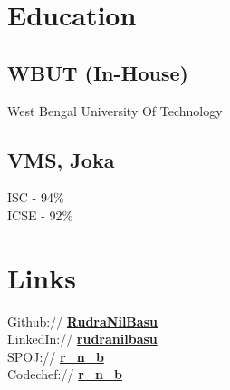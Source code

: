 \documentclass[]{rudra-resume-openfont}
\begin{document}
%
%

%
%

%
%

\begin{minipage}[t]{0.33\textwidth} 


\section{Education} 


\subsection{WBUT (In-House)}
West Bengal University Of Technology\\
\sectionsep

\subsection{VMS, Joka}
ISC - 94\% \\
ICSE - 92\% \\
\sectionsep


\section{Links} 
Github:// \href{https://github.com/RudraNilBasu}{\bf RudraNilBasu} \\
LinkedIn://  \href{https://www.linkedin.com/in/rudranilbasu/}{\bf rudranilbasu} \\
SPOJ://  \href{http://www.spoj.com/users/r_n_b/}{\bf r\_n\_b}\\
Codechef://  \href{https://www.codechef.com/users/r_n_b}{\bf r\_n\_b}




\end{minipage}
\end{document}
